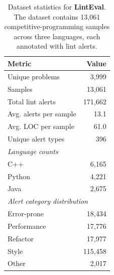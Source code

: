 \begin{table}[t]
\centering
\small
\begin{tabular}{lr}
\toprule
\textbf{Metric} & \textbf{Value} \\
\midrule
Unique problems & 3,999 \\
Samples & 13,061 \\
Total lint alerts & 171,662 \\
Avg. alerts per sample & 13.1 \\
Avg. LOC per sample & 61.0 \\
Unique alert types & 396 \\
\midrule
\multicolumn{2}{l}{\textit{Language counts}} \\
C++ & 6,165 \\
Python & 4,221 \\
Java & 2,675 \\
\midrule
\multicolumn{2}{l}{\textit{Alert category distribution}} \\
Error-prone & 18,434 \\
Performance & 17,776 \\
Refactor & 17,977 \\
Style & 115,458 \\
Other & 2,017 \\
\bottomrule
\end{tabular}
\caption{Dataset statistics for \textbf{LintEval}. The dataset contains 13,061 competitive-programming samples across three languages, each annotated with lint alerts.}
\label{tab:dataset_statistics}
\end{table}